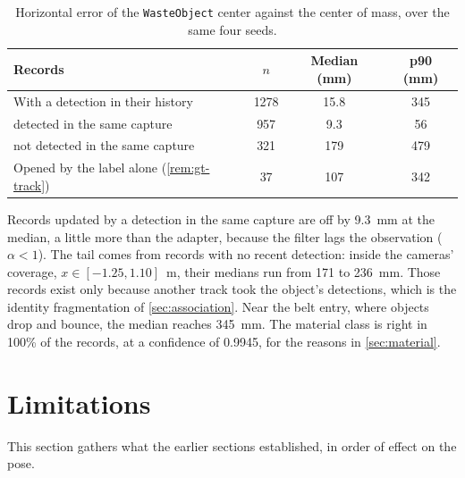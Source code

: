 \documentclass[11pt,a4paper]{article}
\theoremstyle{definition}
\theoremstyle{remark}
\newcommand{\code}[1]{\texttt{#1}}
\begin{document}
\begin{table}[ht]
\centering
\caption{Horizontal error of the \code{WasteObject} center against the center
of mass, over the same four seeds.}
\label{tab:tracker}
\begin{tabular}{@{}lccc@{}}
\toprule
Records & $n$ & Median (mm) & p90 (mm) \\
\midrule
With a detection in their history & 1278 & 15.8 & 345 \\
\quad detected in the same capture & 957 & 9.3 & 56 \\
\quad not detected in the same capture & 321 & 179 & 479 \\
Opened by the label alone (\cref{rem:gt-track}) & 37 & 107 & 342 \\
\bottomrule
\end{tabular}
\end{table}

Records updated by a detection in the same capture are off by 9.3~mm at the
median, a little more than the adapter, because the filter lags the observation
($\alpha<1$). The tail comes from records with no recent detection: inside the
cameras' coverage, $x\in[-1.25, 1.10]$~m, their medians run from 171 to 236~mm.
Those records exist only because another track took the object's detections,
which is the identity fragmentation of \cref{sec:association}. Near the belt
entry, where objects drop and bounce, the median reaches 345~mm. The material
class is right in 100\% of the records, at a confidence of 0.9945, for the
reasons in \cref{sec:material}.

\section{Limitations}
\label{sec:limitations}

This section gathers what the earlier sections established, in order of effect
on the pose.
\end{document}
